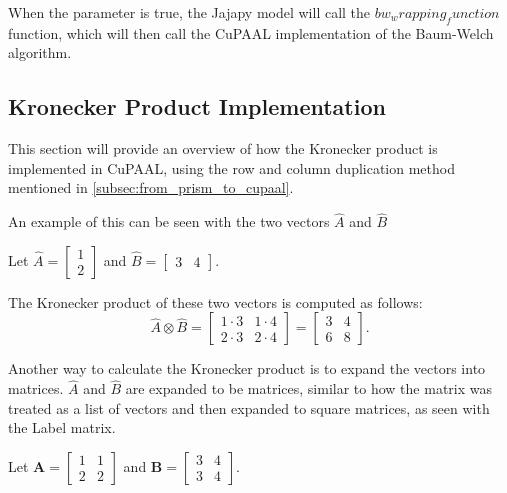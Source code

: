 When the parameter is true, the Jajapy model will call the $bw_wrapping_function$ function, which will then call the CuPAAL implementation of the Baum-Welch algorithm.


\subsection{Kronecker Product Implementation}\label{subsec:kronecker-product-implementation}
This section will provide an overview of how the Kronecker product is implemented in CuPAAL, using the row and column duplication method mentioned in \autoref{subsec:from_prism_to_cupaal}.

An example of this can be seen with the two vectors $\hat{A}$ and $\hat{B}$

Let $\hat{A} = \begin{bmatrix}
            1 \\
            2
      \end{bmatrix}$
and $\hat{B}=\begin{bmatrix}
            3 & 4
      \end{bmatrix}$.

The Kronecker product of these two vectors is computed as follows:
\begin{equation}
      \hat{A} \otimes \hat{B} = \begin{bmatrix}
            1 \cdot 3 & 1 \cdot 4 \\
            2 \cdot 3 & 2 \cdot 4
      \end{bmatrix} = \begin{bmatrix}
            3 & 4 \\
            6 & 8
      \end{bmatrix}.
      \label{eq:kronecker-product-example}
\end{equation}

Another way to calculate the Kronecker product is to expand the vectors into matrices.
$\hat{A}$ and $\hat{B}$ are expanded to be matrices, similar to how the matrix was treated as a list of vectors and then expanded to square matrices, as seen with the Label matrix.

Let $\mathbf{A} = \begin{bmatrix}
            1 & 1 \\
            2 & 2
      \end{bmatrix}$ and
$\mathbf{B} = \begin{bmatrix}
            3 & 4 \\
            3 & 4
      \end{bmatrix}$.

